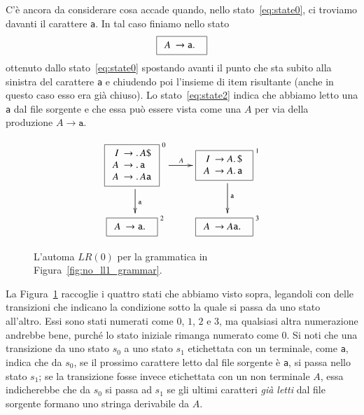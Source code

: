 C'\`e ancora da considerare cosa accade quando, nello stato~\eqref{eq:state0},
ci troviamo davanti il carattere \texttt{a}. In tal caso finiamo nello stato
\begin{equation}\label{eq:state2}
  \fbox{$
  \begin{array}{rl}
     A \!\!\!& \to\mathtt{a}.\,
  \end{array}$
  }
\end{equation}
ottenuto dallo
stato~\eqref{eq:state0} spostando avanti il punto che sta subito alla sinistra
del carattere \texttt{a} e chiudendo poi l'insieme di item risultante
(anche in questo caso esso era gi\`a chiuso).
Lo stato~\eqref{eq:state2} indica che abbiamo
letto una \texttt{a} dal file sorgente e che essa
pu\`o essere vista come una $A$ per via della produzione $A\to\mathtt{a}$.
%
\begin{figure}[t]
\[
\xymatrix{
  \fbox{$
  \begin{array}{rl}
     I \!\!\!& \to\idot A\mathtt{\$}\\
     A \!\!\!& \to\idot\mathtt{a}\\
     A \!\!\!& \to\idot A\mathtt{a}
  \end{array}$}^{\ 0}
  \ar[r]^A\ar[d]^(.6){\mathtt{a}}
  &
  \fbox{$
  \begin{array}{rl}
     I \!\!\!& \to A\idot\mathtt{\$}\\
     A \!\!\!& \to A\idot\mathtt{a}
  \end{array}$
  }^{\ 1}\ar[d]^{\mathtt{a}}\\
  \fbox{$
  \begin{array}{rl}
     A \!\!\!& \to\mathtt{a}\idot
  \end{array}$
  }^{\ 2}
  &
  \fbox{$
  \begin{array}{rl}
     A \!\!\!& \to A\mathtt{a}\idot
  \end{array}$
  }^{\ 3}
}
\]
\caption{L'automa $\mathit{LR}(0)$ per la grammatica in
         Figura~\ref{fig:no_ll1_grammar}.}\label{fig:lr0_automaton}
\end{figure}

La Figura~\ref{fig:lr0_automaton} raccoglie i quattro stati che abbiamo
visto sopra, legandoli con delle transizioni che indicano la condizione
sotto la quale si passa da uno stato all'altro. Essi sono stati
numerati come $0$, $1$, $2$ e $3$, ma qualsiasi altra numerazione andrebbe
bene, purch\'e lo stato iniziale rimanga numerato come $0$.
Si noti che una transizione da uno stato $s_0$ a uno stato $s_1$
etichettata con un terminale, come
\texttt{a}, indica che da $s_0$, se il prossimo carattere letto
dal file sorgente \`e \texttt{a}, si passa nello stato $s_1$;
se la transizione fosse invece etichettata con un non terminale $A$, essa
indicherebbe
che da $s_0$ si passa ad $s_1$ se gli ultimi caratteri \emph{gi\`a letti} dal
file sorgente formano uno stringa derivabile da $A$.

